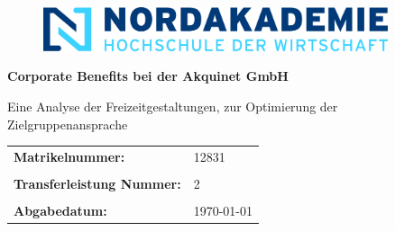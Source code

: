 \thispagestyle{empty}

\vspace{1.5cm}

\begin{figure}[h]
    \centering
    \includegraphics[width=0.9\textwidth]{template/logoNA.png}
\end{figure}

\vspace{1.5cm}

\begin{center}
    \textbf{\Huge{Corporate Benefits bei der Akquinet GmbH}}

\end{center}

\vspace{1.5cm}

\begin{center}
    Eine Analyse der Freizeitgestaltungen, zur Optimierung der Zielgruppenansprache\\
\end{center}

\vspace{4.0cm}

\begin{flushleft}
    \begin{tabular}{ll}
        \textbf{Matrikelnummer:}  & 12831 \\
        &\\
        \textbf{Transferleistung Nummer:} & 2 \\
        &\\
        \textbf{Abgabedatum:}  & \today \\
    \end{tabular}
\end{flushleft}

\pagebreak